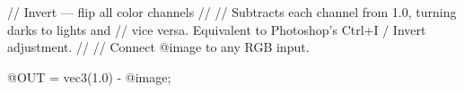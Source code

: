 // Invert — flip all color channels
//
// Subtracts each channel from 1.0, turning darks to lights and
// vice versa. Equivalent to Photoshop's Ctrl+I / Invert adjustment.
//
// Connect @image to any RGB input.

@OUT = vec3(1.0) - @image;